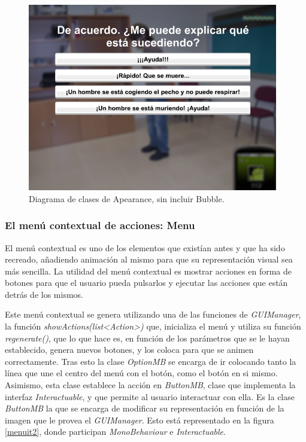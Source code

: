 \begin{figure}[h!]
	\centerline{\includegraphics[width=4.3in]{figures/it2/apearance/blur.png}}
	\caption[Apearance - Versión Final]{Diagrama de clases de Apearance, sin incluir Bubble.}
	\label{blurit2}
\end{figure}

\subsubsection{El menú contextual de acciones: Menu}

El menú contextual es uno de los elementos que existían antes y que ha sido recreado, añadiendo animación al mismo para que su representación visual sea más sencilla. La utilidad del menú contextual es mostrar acciones en forma de botones para que el usuario pueda pulsarlos y ejecutar las acciones que están detrás de los mismos.

Este menú contextual se genera utilizando una de las funciones de \textit{GUIManager}, la función \textit{showActions(list<Action>)} que, inicializa el menú y utiliza su función \textit{regenerate()}, que lo que hace es, en función de los parámetros que se le hayan establecido, genera nuevos botones, y los coloca para que se animen correctamente. Tras esto la clase \textit{OptionMB} se encarga de ir colocando tanto la línea que une el centro del menú con el botón, como el botón en si mismo. Asimismo, esta clase establece la acción en \textit{ButtonMB}, clase que implementa la interfaz \textit{Interactuable}, y que permite al usuario interactuar con ella. Es la clase \textit{ButtonMB} la que se encarga de modificar su representación en función de la imagen que le provea el \textit{GUIManager}. Esto está representado en la figura \ref{menuit2}, donde participan \textit{MonoBehaviour} e \textit{Interactuable}.

